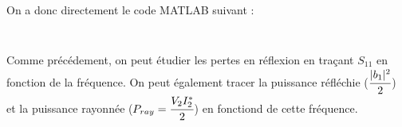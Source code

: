 \documentclass[10pt]{article}
\begin{document}
On a donc directement le code MATLAB suivant :

%
\inputminted[linenos]{matlab}{src/2b.m}

\subsection{}
Comme précédement, on peut étudier les pertes en réflexion en traçant $S_{11}$ en fonction de la fréquence. On peut également tracer la puissance réfléchie ($\cfrac{|b_1|^2}{2}$) et la puissance rayonnée ($P_{ray} = \cfrac{V_2I_2^\ast}{2}$) en fonctiond de cette fréquence.

%
\inputminted[linenos]{matlab}{src/2c.m}
\end{document}
